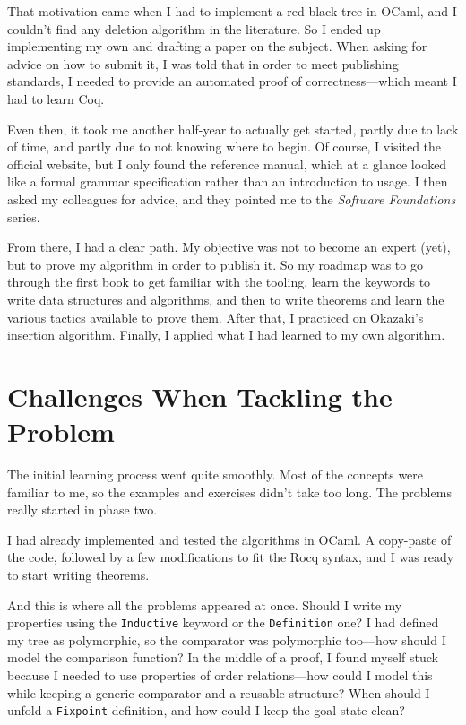 \documentclass[11pt]{article}
\begin{document}
That motivation came when I had to implement a red-black tree in OCaml, and I couldn’t find any deletion algorithm in the literature. So I ended up implementing my own and drafting a paper on the subject. When asking for advice on how to submit it, I was told that in order to meet publishing standards, I needed to provide an automated proof of correctness---which meant I had to learn Coq.

Even then, it took me another half-year to actually get started, partly due to lack of time, and partly due to not knowing where to begin. Of course, I visited the official website, but I only found the reference manual, which at a glance looked like a formal grammar specification rather than an introduction to usage. I then asked my colleagues for advice, and they pointed me to the \textit{Software Foundations} series.

From there, I had a clear path. My objective was not to become an expert (yet), but to prove my algorithm in order to publish it. So my roadmap was to go through the first book to get familiar with the tooling, learn the keywords to write data structures and algorithms, and then to write theorems and learn the various tactics available to prove them. After that, I practiced on Okazaki’s insertion algorithm. Finally, I applied what I had learned to my own algorithm.

\section{Challenges When Tackling the Problem}
The initial learning process went quite smoothly. Most of the concepts were familiar to me, so the examples and exercises didn’t take too long. The problems really started in phase two.

I had already implemented and tested the algorithms in OCaml. A copy-paste of the code, followed by a few modifications to fit the Rocq syntax, and I was ready to start writing theorems.

And this is where all the problems appeared at once. Should I write my properties using the \texttt{Inductive} keyword or the \texttt{Definition} one? I had defined my tree as polymorphic, so the comparator was polymorphic too---how should I model the comparison function? In the middle of a proof, I found myself stuck because I needed to use properties of order relations---how could I model this while keeping a generic comparator and a reusable structure? When should I unfold a \texttt{Fixpoint} definition, and how could I keep the goal state clean?
\end{document}
